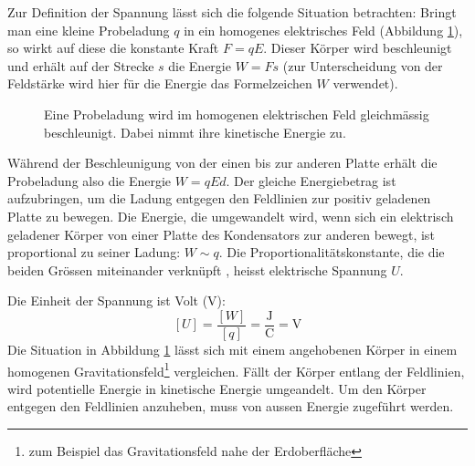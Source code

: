 \documentclass[11pt,twoside=false,open=any]{scrbook}
\begin{document}
Zur Definition der Spannung lässt sich die folgende Situation betrachten: Bringt man eine kleine Probeladung $q$ in ein homogenes elektrisches Feld (Abbildung \ref{homogenesfeld}), so wirkt auf diese die konstante Kraft $F=q E$. Dieser Körper wird beschleunigt und erhält auf der Strecke $s$ die Energie $W = F s$ (zur Unterscheidung von der Feldstärke wird hier für die Energie das Formelzeichen $W$ verwendet).

\begin{figure}[h]
\begin{center}

\caption{Eine Probeladung wird im homogenen elektrischen Feld gleichmässig beschleunigt. Dabei nimmt ihre kinetische Energie zu.}
\label{homogenesfeld}
\end{center}
\end{figure}

Während der Beschleunigung von der einen bis zur anderen Platte erhält die Probeladung also die Energie $W = q E d$. Der gleiche Energiebetrag ist aufzubringen, um die Ladung entgegen den Feldlinien zur positiv geladenen Platte zu bewegen. Die Energie, die umgewandelt wird, wenn sich ein elektrisch geladener Körper von einer Platte des Kondensators zur anderen bewegt, ist proportional zu seiner Ladung: $W \sim q$. Die Proportionalitätskonstante, die die beiden Grössen miteinander verknüpft , heisst elektrische Spannung $U$.

\begin{center}
   \setlength{\fboxrule}{2pt}
\end{center}

Die Einheit der Spannung ist Volt (\si{\volt}):
\begin{equation}
\left[ U \right] = \frac{\left[ W \right]}{\left[ q \right]} = \frac{\si{\joule}}{\si{\coulomb}} = \si{\volt}
\label{einheitU}
\end{equation}
Die Situation in Abbildung \ref{homogenesfeld} lässt sich mit einem angehobenen Körper in einem homogenen Gravitationsfeld\footnote{zum Beispiel das Gravitationsfeld nahe der Erdoberfläche} vergleichen. Fällt der Körper entlang der Feldlinien, wird potentielle Energie in kinetische Energie umgeandelt. Um den Körper entgegen den Feldlinien anzuheben, muss von aussen Energie zugeführt werden.
\end{document}
